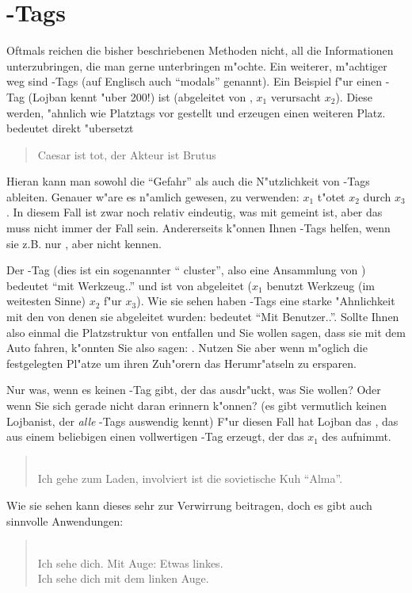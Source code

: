 \section{-Tags}
Oftmals reichen die bisher beschriebenen Methoden nicht, all die Informationen unterzubringen, die man gerne unterbringen m"ochte. Ein weiterer,
m"achtiger weg sind -Tags (auf Englisch auch ``modals'' genannt). Ein Beispiel f"ur einen -Tag (Lojban kennt "uber 200!) ist
 (abgeleitet von , $x_1$ verursacht $x_2$). Diese  werden, "ahnlich wie Platztags vor  gestellt
und erzeugen einen weiteren Platz.  bedeutet direkt "ubersetzt
\begin{quote}
Caesar ist tot, der Akteur ist Brutus
\end{quote}
Hieran kann man sowohl die ``Gefahr'' als auch die N"utzlichkeit von -Tags ableiten. Genauer w"are es n"amlich gewesen,  zu
verwenden: $x_1$ t"otet $x_2$ durch $x_3$. In diesem Fall ist zwar noch relativ eindeutig, was mit  gemeint ist, aber das muss nicht
immer der Fall sein. Andererseits k"onnen Ihnen -Tags helfen, wenn sie z.B. nur , aber nicht  kennen.

Der -Tag  (dies ist ein sogenannter `` cluster'', also eine Ansammlung von ) bedeutet ``mit Werkzeug..'' und ist von  abgeleitet ($x_1$ benutzt Werkzeug (im weitesten Sinne) $x_2$ f"ur $x_3$). Wie sie sehen haben -Tags
eine starke "Ahnlichkeit mit den  von denen sie abgeleitet wurden:  bedeutet ``Mit Benutzer..''.
Sollte Ihnen also einmal die Platzstruktur von  entfallen und Sie wollen sagen, dass sie mit dem Auto fahren, k"onnten Sie also sagen: .
Nutzen Sie aber wenn m"oglich die festgelegten Pl"atze um ihren Zuh"orern das Herumr"atseln zu ersparen.

Nur was, wenn es keinen -Tag gibt, der das ausdr"uckt, was Sie wollen? Oder wenn Sie sich gerade nicht daran erinnern k"onnen? (es gibt
vermutlich keinen Lojbanist, der \emph{alle} -Tags auswendig kennt)
F"ur diesen Fall hat Lojban das  , das aus einem beliebigen  einen vollwertigen -Tag erzeugt, der das $x_1$ des  aufnimmt.
\begin{quote}
 \\
Ich gehe zum Laden, involviert ist die sovietische Kuh ``Alma''.
\end{quote}
Wie sie sehen kann dieses  sehr zur Verwirrung beitragen, doch es gibt auch sinnvolle Anwendungen:
\begin{quote}
 \\
Ich sehe dich. Mit Auge: Etwas linkes. \\
Ich sehe dich mit dem linken Auge.
\end{quote}

